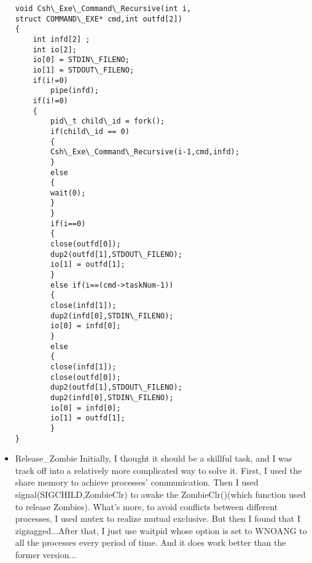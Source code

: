 \documentclass{article}
\begin{document}
\begin{itemize}
\begin{lstlisting}
void Csh\_Exe\_Command\_Recursive(int i, 
struct COMMAND\_EXE* cmd,int outfd[2])
{
	int infd[2] ; 
	int io[2];
	io[0] = STDIN\_FILENO;
	io[1] = STDOUT\_FILENO;
	if(i!=0)
		pipe(infd);
	if(i!=0)
	{
		pid\_t child\_id = fork();
		if(child\_id == 0)
		{
		Csh\_Exe\_Command\_Recursive(i-1,cmd,infd);
		}
		else 
		{
		wait(0);
		}
		}
		if(i==0)
		{
		close(outfd[0]);
		dup2(outfd[1],STDOUT\_FILENO);
		io[1] = outfd[1];
		}
		else if(i==(cmd->taskNum-1))
		{
		close(infd[1]);
		dup2(infd[0],STDIN\_FILENO);
		io[0] = infd[0];
		}
		else 
		{
		close(infd[1]);
		close(outfd[0]);
		dup2(outfd[1],STDOUT\_FILENO);
		dup2(infd[0],STDIN\_FILENO);
		io[0] = infd[0];
		io[1] = outfd[1];
		}
}
				\end{lstlisting}
				
				\item Release\_Zombie
					Initially, I thought it should be a skillful task, and I was track off into a relatively more complicated way to solve it. First, I used the share memory to achieve processes' communication. Then I used signal(SIGCHILD,ZombieClr) to awake the ZombieClr()(which function used to release Zombies). What's more, to avoid conflicts between different processes, I used mutex to realize mutual exclusive. But then I found that I zigzagged...After that, I just use waitpid whose option is set to WNOANG to all the processes every period of time. And it does work better than the former version...
			\end{itemize}	
\end{document}
